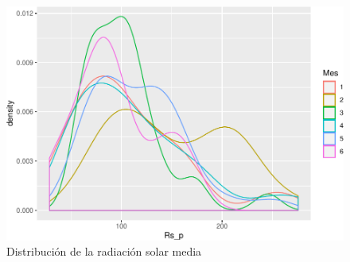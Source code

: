 \documentclass[conference,final,]{IEEEtran}
\makeatletter
\def\maxwidth{\ifdim\Gin@nat@width>\linewidth\linewidth
\else\Gin@nat@width\fi}
\let\Oldincludegraphics\includegraphics
\renewcommand{\includegraphics}[1]{\Oldincludegraphics[width=\maxwidth]{#1}}
\makeatother
\begin{document}
\begin{figure}
\centering
\includegraphics{Hidrology_files/figure-latex/unnamed-chunk-14-1.pdf}
\caption{Distribución de la radiación solar media}
\end{figure}
\end{document}
